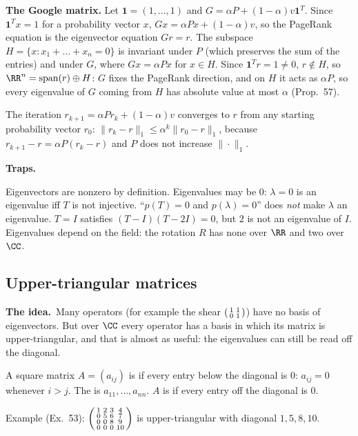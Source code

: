 \documentclass[10pt]{scrartcl}
\DeclareMathOperator{\spn}{span}
\newcommand{\traps}{\par\medskip\noindent\textbf{\color{RawSienna}Traps.}\ }
\newcommand{\idea}{\par\noindent\textbf{\color{MidnightBlue}The idea.}\ }
\begin{document}
\textbf{The Google matrix.} Let $\mathbf 1=(1,\dots,1)$ and $G=\alpha P+(1-\alpha)v\mathbf 1^T$. Since $\mathbf 1^Tx=1$ for a probability vector $x$, $Gx=\alpha Px+(1-\alpha)v$, so the PageRank equation is the eigenvector equation $Gr=r$. The subspace $H=\{x:x_1+\dots+x_n=0\}$ is invariant under $P$ (which preserves the sum of the entries) and under $G$, where $Gx=\alpha Px$ for $x\in H$. Since $\mathbf 1^Tr=1\ne0$, $r\notin H$, so $\RR^n=\spn(r)\oplus H$: $G$ fixes the PageRank direction, and on $H$ it acts as $\alpha P$, so every eigenvalue of $G$ coming from $H$ has absolute value at most $\alpha$ (Prop.~57).

The iteration $r_{k+1}=\alpha Pr_k+(1-\alpha)v$ converges to $r$ from any starting probability vector $r_0$: $\|r_k-r\|_1\le\alpha^k\|r_0-r\|_1$, because $r_{k+1}-r=\alpha P(r_k-r)$ and $P$ does not increase $\|\cdot\|_1$.

\traps
\begin{itemize}
  \ii Eigenvectors are nonzero by definition. Eigenvalues may be $0$: $\lambda=0$ is an eigenvalue iff $T$ is not injective.
  \ii ``$p(T)=0$ and $p(\lambda)=0$'' does \emph{not} make $\lambda$ an eigenvalue. $T=I$ satisfies $(T-I)(T-2I)=0$, but $2$ is not an eigenvalue of $I$.
  \ii Eigenvalues depend on the field: the rotation $R$ has none over $\RR$ and two over $\CC$.
\end{itemize}

\subsection{Upper-triangular matrices}
\idea Many operators (for example the shear $\begin{psmallmatrix}1&1\\0&1\end{psmallmatrix}$) have no basis of eigenvectors. But over $\CC$ every operator has a basis in which its matrix is upper-triangular, and that is almost as useful: the eigenvalues can still be read off the diagonal.

\begin{definition*}[Def.~33]
  A square matrix $A=(a_{ij})$ is  if every entry below the diagonal is $0$: $a_{ij}=0$ whenever $i>j$. The  is $a_{11},\dots,a_{nn}$. $A$ is  if every entry off the diagonal is $0$.
\end{definition*}
Example (Ex.~53): $\begin{psmallmatrix}1&2&3&4\\0&5&6&7\\0&0&8&9\\0&0&0&10\end{psmallmatrix}$ is upper-triangular with diagonal $1,5,8,10$.
\end{document}
